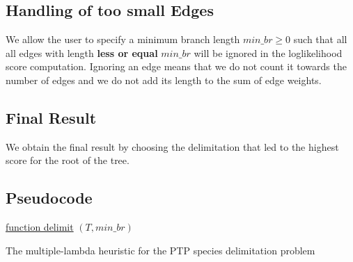 \documentclass{llncs}
\begin{document}
\subsection{Handling of too small Edges}

We allow the user to specify a minimum branch length $min\_br \geq 0$ such that all all edges with length \textbf{less or equal} $min\_br$ will be ignored in the loglikelihood score computation. Ignoring an edge means that we do not count it towards the number of edges and we do not add its length to the sum of edge weights.

\subsection{Final Result}
We obtain the final result by choosing the delimitation that led to the highest score for the root of the tree.

\subsection{Pseudocode}
\begin{algorithm}

\underline{function delimit} $(T, min\_br)$\;


\caption{The multiple-lambda heuristic for the PTP species delimitation problem}


\end{algorithm}



\end{document}
